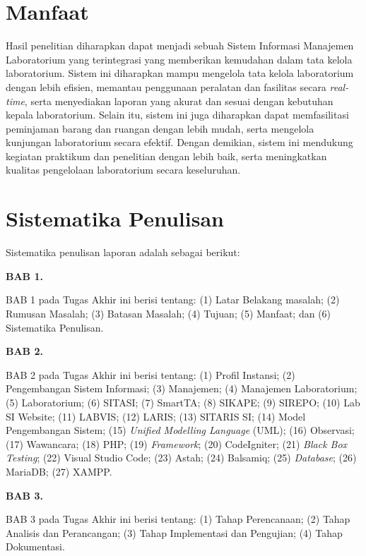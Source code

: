 \section{Manfaat}
Hasil penelitian diharapkan dapat menjadi sebuah Sistem Informasi Manajemen Laboratorium yang terintegrasi yang memberikan kemudahan dalam tata kelola laboratorium. Sistem ini diharapkan mampu mengelola tata kelola laboratorium dengan lebih efisien, memantau penggunaan peralatan dan fasilitas secara \textit{real-time}, serta menyediakan laporan yang akurat dan sesuai dengan kebutuhan kepala laboratorium. Selain itu, sistem ini juga diharapkan dapat memfasilitasi peminjaman barang dan ruangan dengan lebih mudah, serta mengelola kunjungan laboratorium secara efektif. Dengan demikian, sistem ini mendukung kegiatan praktikum dan penelitian dengan lebih baik, serta meningkatkan kualitas pengelolaan laboratorium secara keseluruhan.
\section{Sistematika Penulisan}
Sistematika penulisan laporan adalah sebagai berikut:

\textbf{BAB 1. \babSatu}

BAB 1 pada Tugas Akhir ini berisi tentang: (1) Latar Belakang masalah; (2) Rumusan Masalah; (3) Batasan Masalah; (4) Tujuan; (5) Manfaat; dan (6) Sistematika Penulisan.

\textbf{BAB 2. \babDua}

BAB 2 pada Tugas Akhir ini berisi tentang: (1) Profil Instansi; (2) Pengembangan Sistem Informasi; (3) Manajemen; (4) Manajemen Laboratorium; (5) Laboratorium; (6) SITASI; (7) SmartTA; (8) SIKAPE; (9) SIREPO; (10) Lab SI Website; (11) LABVIS; (12) LARIS; (13) SITARIS SI; (14) Model Pengembangan Sistem; (15) \textit{Unified Modelling Language} (UML); (16) Observasi; (17) Wawancara; (18) PHP; (19) \textit{Framework}; (20) CodeIgniter; (21) \textit{Black Box Testing}; (22) Visual Studio Code; (23) Astah; (24) Balsamiq; (25) \textit{Database}; (26) MariaDB; (27) XAMPP.

\textbf{BAB 3. \babTiga}

BAB 3 pada Tugas Akhir ini berisi tentang: (1) Tahap Perencanaan; (2) Tahap Analisis dan Perancangan; (3) Tahap Implementasi dan Pengujian; (4) Tahap Dokumentasi.


